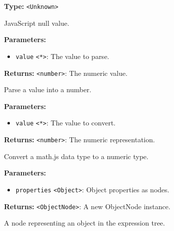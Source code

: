 \documentclass[12pt,a4paper]{article}
\begin{document}
\noindent \textbf{Type:} \texttt{<Unknown>}

\noindent JavaScript null value.

\vspace{5mm}
\noindent {}


\noindent \textbf{Parameters:}
\begin{itemize}
  \item \texttt{value} \texttt{<*>}: The value to parse.
\end{itemize}

\noindent \textbf{Returns:} \texttt{<number>}: The numeric value.

\noindent Parse a value into a number.

\vspace{5mm}
\noindent {}


\noindent \textbf{Parameters:}
\begin{itemize}
  \item \texttt{value} \texttt{<*>}: The value to convert.
\end{itemize}

\noindent \textbf{Returns:} \texttt{<number>}: The numeric representation.

\noindent Convert a math.js data type to a numeric type.

\vspace{5mm}
\noindent {}


\noindent \textbf{Parameters:}
\begin{itemize}
  \item \texttt{properties} \texttt{<Object>}: Object properties as nodes.
\end{itemize}

\noindent \textbf{Returns:} \texttt{<ObjectNode>}: A new ObjectNode instance.

\noindent A node representing an object in the expression tree.

\vspace{5mm}
\noindent {}
\end{document}
